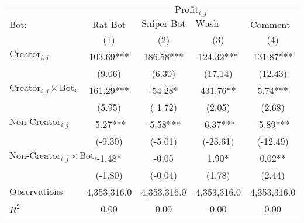 \begin{tabular}{lcccc}
\toprule
 & \multicolumn{4}{c}{$\text{Profit}_{i,j}$} \\
\cline{2-5}
 $\text{Bot}:$ & $\text{Rat Bot}$ & $\text{Sniper Bot}$ & $\text{Wash Trading Bot}$ & $\text{Comment Bot}$ \\
 & (1) & (2) & (3) & (4)\\
\midrule
$\text{Creator}_{i,j}$ & 103.69*** & 186.58*** & 124.32*** & 131.87*** \\
 & (9.06) & (6.30) & (17.14) & (12.43) \\
$\text{Creator}_{i,j} \times \text{Bot}_i$ & 161.29*** & -54.28* & 431.76** & 5.74*** \\
 & (5.95) & (-1.72) & (2.05) & (2.68) \\
$\text{Non-Creator}_{i,j}$ & -5.27*** & -5.58*** & -6.37*** & -5.89*** \\
 & (-9.30) & (-5.01) & (-23.61) & (-12.49) \\
$\text{Non-Creator}_{i,j} \times \text{Bot}_i$ & -1.48* & -0.05 & 1.90* & 0.02** \\
 & (-1.80) & (-0.04) & (1.78) & (2.44) \\
\midrule
$\text{Observations}$ & 4,353,316.0 & 4,353,316.0 & 4,353,316.0 & 4,353,316.0 \\
$R^2$ & 0.00 & 0.00 & 0.00 & 0.00 \\
\bottomrule
\end{tabular}
